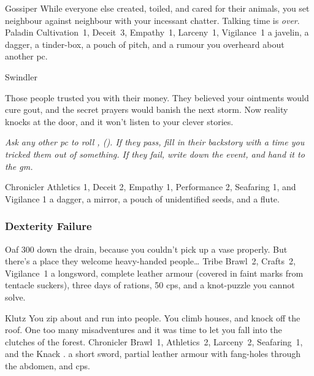 \begin{multicols}{2}
\begin{itemize}
    {Gossiper}%
    {
      While everyone else created, toiled, and cared for their animals, you set neighbour against neighbour with your incessant chatter.
      Talking time is \emph{over}.
    }%
    {Paladin}%
    {Cultivation~1, Deceit~3, Empathy~1, Larceny~1, Vigilance~1}%
    {a javelin, a dagger, a tinder-box, a pouch of pitch,%
      and a rumour you overheard about another \gls{pc}.}%

    {Swindler}%
    {
      Those people trusted you with their money.
      They believed your ointments would cure gout, and the secret prayers would banish the next storm.
      Now reality knocks at the door, and it won't listen to your clever stories.

      \textit{Ask any other \gls{pc} to roll , (\tn[8]).
      If they pass, fill in their backstory with a time you tricked them out of something.
      If they fail, write down the event, and hand it to the \gls{gm}.}
    }%
    {Chronicler}%
    {Athletics 1, Deceit 2, Empathy 1, Performance 2, Seafaring 1, and Vigilance 1}%
    {
      a dagger, a mirror, a pouch of unidentified seeds, and a flute.
    }%

\end{itemize}

\null


\subsubsection{Dexterity Failure}

\nobreak
\begin{itemize}

    {Oaf}%
    {300  down the drain, because you couldn't pick up a vase properly.
      But there's a place they welcome heavy-handed people\ldots
    }%
    {Tribe}%
    {Brawl~2, Crafts~2, Vigilance~1}%
    {a longsword, complete leather armour (covered in faint marks from tentacle suckers), three days of rations, 50 \glspl{cp}, and a knot-puzzle you cannot solve.}%

    {Klutz}%
    {You zip about and run into people.
      You climb houses, and knock off the roof.
      One too many misadventures and it was time to let you fall into the clutches of the forest.}%
    {Chronicler}%
    {Brawl~1, Athletics~2, Larceny~2, Seafaring~1, and the Knack \charge.}%
    {a short sword, partial leather armour with fang-holes through the abdomen, and  \glspl{cp}.}%


\end{itemize}
\end{multicols}
